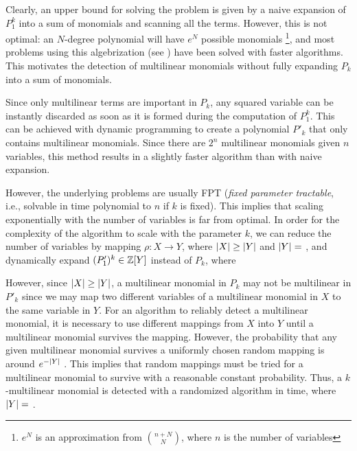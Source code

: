 Clearly, an upper bound for solving the problem is given by a 
naive expansion of $P_1^k$ into a sum of monomials and scanning all the terms. 
However, this is not optimal: an $N$-degree polynomial will have $e^N$ 
possible monomials
\footnote{$e^N$ is an approximation from $\binom{n+N}{N}$, where $n$ is the number of variables}, 
and most problems using this algebrization 
(see ) 
have been solved with faster algorithms. 
This motivates the detection of multilinear monomials 
without fully expanding $P_k$ into a sum of monomials.

Since only multilinear terms are important in $P_k$, 
any squared variable can be instantly discarded as 
soon as it is formed 
during the computation of $P_1^k$. 
This can be achieved with dynamic programming 
to create a polynomial $P'_k$ that 
only contains multilinear monomials. 
Since there are $2^n$ multilinear monomials given $n$ variables, 
this method results in a slightly 
faster algorithm than with naive expansion.

However, the underlying problems are usually FPT 
(\emph{fixed parameter tractable}, i.e., 
solvable in time polynomial to $n$ if $k$ is fixed). 
This implies that scaling exponentially 
with the number of variables is far from optimal. 
In order for the complexity of the algorithm to scale 
with the parameter $k$, we can reduce the number of variables 
by mapping $\rho \colon X \to Y$, where 
${\left\vert X\right\vert} \geq {\left\vert Y\right\vert}$ and ${\left\vert Y\right\vert} =$ , 
and dynamically expand $(P'_1)^k \in \mathbb Z[Y]$ instead of
$P_k$, where

However, since ${\left\vert X\right\vert} \geq {\left\vert Y\right\vert}$, 
a multilinear monomial in $P_k$ may not be multilinear in $P'_k$ since 
we may map two different variables of a multilinear monomial in $X$ 
to the same variable in $Y$. 
For an algorithm to reliably detect a multilinear monomial, 
it is necessary to use different mappings 
from $X$ into $Y$ until a multilinear monomial survives the mapping. 
However, the probability that any given 
multilinear monomial survives a uniformly chosen random mapping
is around $e^{-{\left\vert Y\right\vert}}$ \cite{KouWil15}. 
This implies that 
 random mappings must be tried for a 
multilinear monomial to survive with a reasonable constant probability. Thus, a 
$k$-multilinear monomial is detected with a 
randomized algorithm in  time, where ${\left\vert Y\right\vert} =$ .

